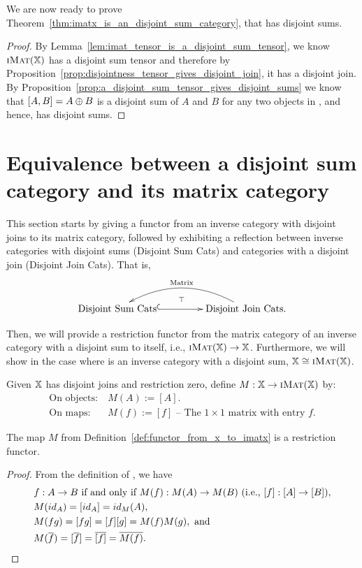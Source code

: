 We are now ready to prove Theorem~\ref{thm:imatx_is_an_disjoint_sum_category}, that \imatx has
disjoint sums.

\begin{proof}
  By Lemma~\ref{lem:imat_tensor_is_a_disjoint_sum_tensor}, we know $\textsc{iMat}({\mathbb{X}})$ has a disjoint sum
  tensor and therefore by Proposition~\ref{prop:disjointness_tensor_gives_disjoint_join},
  it has a disjoint join. By Proposition~\ref{prop:a_disjoint_sum_tensor_gives_disjoint_sums}
  we know that $[A,B] = A\oplus B$ is a disjoint sum of $A$ and $B$ for any two objects in \imatx, and
  hence, \imatx has disjoint sums.
\end{proof}

\section{Equivalence between a disjoint sum category and its matrix category} %
\label{sec:equivalence_between_an_disjoint_sum_category_and_its_matrix_category}
This section starts by giving a functor from an inverse category with disjoint joins to its matrix
category, followed by exhibiting a reflection between inverse categories with disjoint sums
(Disjoint Sum Cats) and categories with a disjoint join (Disjoint Join Cats). That is,
\[
   \xymatrix@R+10pt@C+20pt{
     \text{Disjoint Sum Cats} \ar@{^{(}->}[r]
     & \text{Disjoint Join Cats.} \ar@/_1.8pc/[l]_{\text{Matrix}} \ar@{}@<-1ex>[l]_{\top}
   }
\]

Then, we will provide a restriction functor from the matrix category of an inverse category with a
disjoint sum to itself, i.e., $\textsc{iMat}({\mathbb{X}}) \to \mathbb{X}$.  Furthermore, we will show in the case where \X is an
inverse category with a disjoint sum, $\mathbb{X}\cong \textsc{iMat}({\mathbb{X}})$.

\begin{definition}\label{def:functor_from_x_to_imatx}
  Given $\mathbb{X}$ has disjoint joins and restriction zero, define $M:\mathbb{X} \to \textsc{iMat}({\mathbb{X}})$ by:
  \begin{align*}
    \text{On objects:}\ &M(A) := [A].\\
    \text{On maps:}\ &M(f) := [f] \text{ -- The }1\times1\text{ matrix with entry }f.
  \end{align*}
\end{definition}
\begin{lemma}\label{lem:m_is_a_functor}
  The map $M$ from Definition~\ref{def:functor_from_x_to_imatx} is a restriction functor.
\end{lemma}
\begin{proof}
  From the definition of \imatx, we have
  \begin{align*}
    &f: A\to B \text{ if and only if } M(f):M(A)\to M(B)\  (\text{i.e., }[f]: [A]\to [B]),\\
    &M(id_A)  = [id_{A}] = id_M(A),\\
    &M(f g) = [f g] = [f][g] = M(f) M(g),\text{ and}\\
    &M(\overline{f}) = [\overline{f}] = \overline{[f]} = \overline{M(f)}.
  \end{align*}
\end{proof}

